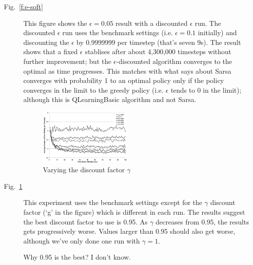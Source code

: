 \begin{description}
\item[Fig.~\ref{f:e-soft}]
This figure shows the $\epsilon = 0.05$ result with a discounted
$\epsilon$ run. The discounted $\epsilon$ run uses the benchmark
settings (i.e. $\epsilon = 0.1$ initially) and discounting the
$\epsilon$ by 0.9999999 per timestep (that's seven 9s). The result shows
that a fixed $\epsilon$ stablises after about 4,300,000 timesteps
without further improvement; but the $\epsilon$-discounted algorithm
converges to the optimal as time progresses. This matches with what
\cite{Sutton_1998} says about Sarsa converges with probability
1 to an optimal policy only if the policy converges in the
limit to the greedy policy (i.e. $\epsilon$ tends to 0 in the limit);
although this is QLearningBasic algorithm and not Sarsa.

\begin{figure}
\centering
\includegraphics[width=0.45\textwidth]{discountFactor}
\caption{Varying the discount factor $\gamma$}\label{f:discountFactor}
\end{figure}

\item[Fig.~\ref{f:discountFactor}]
This experiment uses the benchmark settings except for the $\gamma$
discount factor (`g' in the figure) which is different in each run.
The results suggest the best discount factor to use is 0.95. As
$\gamma$ decreases from 0.95, the results gets progressively worse.
Values larger than 0.95 should also get worse, although we've only
done one run with $\gamma = 1$.

Why 0.95 is the best? I don't know.

\end{description}


